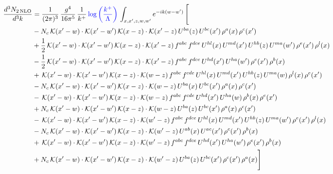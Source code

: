 \documentclass[9pt]{article}
\numberwithin{equation}{section}
\begin{document}
\begin{align}
\frac{d^{3}N_{2\,\mathrm{NLO}}}{d^{3}k} & = \frac{1}{(2\pi)^{3}}\,\frac{g^{4}}{16\pi^{5}}\,\frac{1}{k^{+}}\,{\color{blue}\log{\left(\frac{k^{+}}{\Lambda}\right)}}\,\int_{x,x',z,w,w'}e^{-ik(w-w')}\,\Bigg[\notag\\ & -N_{c}\,\mathcal{K}(x'-w)\cdot\mathcal{K}(x'-w')\,\mathcal{K}(x-z)\cdot\mathcal{K}(x'-z)\,U^{ba}(z)\,U^{bc}(x')\,\rho^{a}(x)\,\rho^{c}(x')\notag\\
& +\frac{1}{2}\,\mathcal{K}(x'-w)\cdot\mathcal{K}(x'-w')\,\mathcal{K}(x-z)\cdot\mathcal{K}(x'-z)\,f^{abc}\,f^{dce}\,U^{hl}(x)\,U^{md}(x')\,U^{hb}(z)\,U^{ma}(w')\,\rho^{e}(x')\,\rho^{l}(x)\notag\\
& -\frac{1}{2}\,\mathcal{K}(x'-w)\cdot\mathcal{K}(x'-w')\,\mathcal{K}(x-z)\cdot\mathcal{K}(x'-z)\,f^{abc}\,f^{dce}\,U^{hd}(x')\,U^{ha}(w')\,\rho^{e}(x')\,\rho^{b}(x)\notag\\
& +\,\mathcal{K}(x'-w)\cdot\mathcal{K}(x'-w')\,\mathcal{K}(x-z)\cdot\mathcal{K}(w-z)\,f^{abc}\,f^{cde}\,U^{hl}(x)\,U^{md}(x')\,U^{hb}(z)\,U^{ma}(w)\,\rho^{l}(x)\,\rho^{e}(x')\notag\\
& -N_{c}\,\mathcal{K}(x'-w)\cdot\mathcal{K}(x'-w')\,\mathcal{K}(x-z)\cdot\mathcal{K}(w-z)\,U^{ba}(x)\,U^{bc}(x')\,\rho^{a}(x)\,\rho^{c}(x')\notag\\
& -\,\mathcal{K}(x'-w)\cdot\mathcal{K}(x'-w')\,\mathcal{K}(x-z)\cdot\mathcal{K}(w-z)\,f^{abc}\,f^{cde}\,U^{hd}(x')\,U^{ha}(w)\,\rho^{b}(x)\,\rho^{e}(x')\notag\\
& +N_{c}\,\mathcal{K}(x'-w)\cdot\mathcal{K}(x'-w')\,\mathcal{K}(x-z)\cdot\mathcal{K}(w-z)\,U^{ba}(z)\,U^{bc}(x')\,\rho^{a}(x)\,\rho^{c}(x')\notag\\
& -\,\mathcal{K}(x'-w)\cdot\mathcal{K}(x'-w')\,\mathcal{K}(x-z)\cdot\mathcal{K}(w'-z)\,f^{abc}\,f^{dce}\,U^{hl}(x)\,U^{md}(x')\,U^{hb}(z)\,U^{ma}(w')\,\rho^{e}(x')\,\rho^{l}(x)\notag\\
& -N_{c}\,\mathcal{K}(x'-w)\cdot\mathcal{K}(x'-w')\,\mathcal{K}(x-z)\cdot\mathcal{K}(w'-z)\,U^{ab}(x)\,U^{ac}(x')\,\rho^{c}(x')\,\rho^{b}(x)\notag\\
& +\,\mathcal{K}(x'-w)\cdot\mathcal{K}(x'-w')\,\mathcal{K}(x-z)\cdot\mathcal{K}(w'-z)\,f^{abc}\,f^{dce}\,U^{hd}(x')\,U^{ha}(w')\,\rho^{e}(x')\,\rho^{b}(x)\notag\\
& +N_{c}\,\mathcal{K}(x'-w)\cdot\mathcal{K}(x'-w')\,\mathcal{K}(x-z)\cdot\mathcal{K}(w'-z)\,U^{ba}(z)\,U^{bc}(x')\,\rho^{c}(x')\,\rho^{a}(x)\Bigg]
\end{align}
\end{document}
